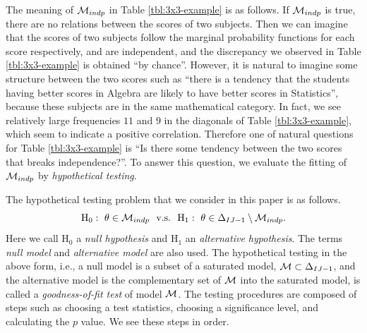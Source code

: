 \documentclass[12pt]{article}
\theoremstyle{definition}
\def\Btheta{{\bf \theta}}
\begin{document}
The meaning of ${\cal M}_{indp}$ in Table \ref{tbl:3x3-example} is 
as follows. If ${\cal M}_{indp}$ is true, there are no relations between
the scores of two subjects. Then we can imagine that the scores of two 
subjects follow the marginal probability functions for each score
respectively, and are independent, and the discrepancy we observed in Table 
\ref{tbl:3x3-example} is obtained ``by chance''. 
However, it is natural to imagine some
structure between the two scores such as ``there is a tendency that the
students having better scores in Algebra are likely to have better scores
in Statistics'', because these subjects are in the same mathematical
category. In fact, we see relatively large frequencies $11$ and $9$ in
the diagonals of Table \ref{tbl:3x3-example}, which seem to indicate a
positive correlation. 
Therefore one of natural questions for Table \ref{tbl:3x3-example} is 
``Is there some tendency between the two scores that breaks independence?''.
To answer this question, 
we evaluate the fitting of ${\cal M}_{indp}$
by {\it hypothetical testing}.

The hypothetical testing problem that we consider in this paper
is as follows.
\[
 \mbox{H}_0:\ \Btheta \in {\cal M}_{indp}\ \ \mbox{v.s.}\ \ 
\mbox{H}_1:\ \Btheta \in \Delta_{IJ-1}\setminus {\cal M}_{indp}.
\]
Here we call $\mbox{H}_0$ a {\it null hypothesis} and 
$\mbox{H}_1$ an {\it alternative hypothesis}. The terms {\it
null model} and {\it alternative model} are also used. 
The hypothetical testing
in the above form, i.e., a null model is a subset of a saturated
model, ${\cal M} \subset \Delta_{IJ-1}$, and the alternative model is
the complementary set of ${\cal M}$ into the saturated model, 
is called a {\it goodness-of-fit test} of
model ${\cal M}$. The testing procedures are composed of steps such as
choosing a test statistics, choosing a significance level, and
calculating the $p$ value. We see these steps in order.
\end{document}
